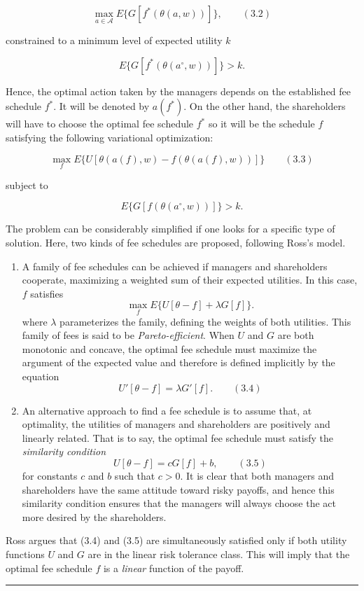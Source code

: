 \documentclass[11pt,a4paper]{article}
\newcommand{\stmtend}{\par\endgroup\nopagebreak\noindent\rule{\linewidth}{0.4pt}\par\medskip}
\begin{document}
\[\max_{a \in \mathcal{A}} E\{G[f^*(\theta(a, w))]\}, \qquad (3.2)\]

constrained to a minimum level of expected utility \(k\)

\[E\{G[f^*(\theta(a^\circ, w))]\} > k.\]

Hence, the optimal action taken by the managers depends on the established fee schedule \(f^*\). It
will be denoted by \(a(f^*)\). On the other hand, the shareholders will have to choose the optimal
fee schedule \(f^*\) so it will be the schedule \(f\) satisfying the following variational
optimization:

\[\max_f E\{U[\theta(a(f), w) - f(\theta(a(f), w))]\} \qquad (3.3)\]

subject to

\[E\{G[f(\theta(a^\circ, w))]\} > k.\]

The problem can be considerably simplified if one looks for a specific type of solution. Here, two
kinds of fee schedules are proposed, following Ross's model.

\begin{enumerate}
\def\labelenumi{\arabic{enumi}.}
\item
  A family of fee schedules can be achieved if managers and shareholders cooperate, maximizing a
  weighted sum of their expected utilities. In this case, \(f\) satisfies
  \[\max_f E\{U[\theta - f] + \lambda G[f]\}.\] where \(\lambda\) parameterizes the family, defining
  the weights of both utilities. This family of fees is said to be \emph{Pareto-efficient}. When
  \(U\) and \(G\) are both monotonic and concave, the optimal fee schedule must maximize the
  argument of the expected value and therefore is defined implicitly by the equation
  \[U'[\theta - f] = \lambda G'[f]. \qquad (3.4)\]
\item
  An alternative approach to find a fee schedule is to assume that, at optimality, the utilities of
  managers and shareholders are positively and linearly related. That is to say, the optimal fee
  schedule must satisfy the \emph{similarity condition} \[U[\theta - f] = cG[f] + b, \qquad (3.5)\]
  for constants \(c\) and \(b\) such that \(c > 0\). It is clear that both managers and shareholders
  have the same attitude toward risky payoffs, and hence this similarity condition ensures that the
  managers will always choose the act more desired by the shareholders.
\end{enumerate}

Ross argues that (3.4) and (3.5) are simultaneously satisfied only if both utility functions \(U\)
and \(G\) are in the linear risk tolerance class. This will imply that the optimal fee schedule
\(f\) is a \emph{linear} function of the payoff.
\stmtend
\end{document}
